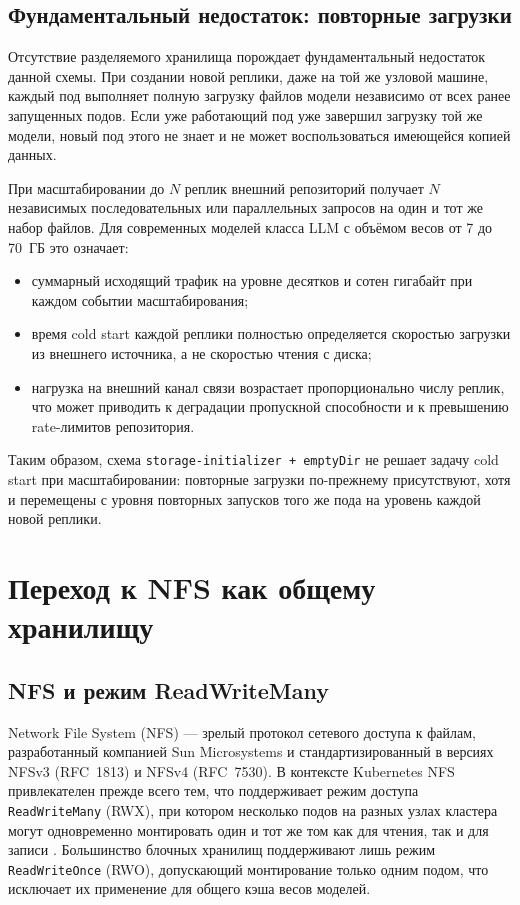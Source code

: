 \subsection*{Фундаментальный недостаток: повторные загрузки}

Отсутствие разделяемого хранилища порождает фундаментальный недостаток данной схемы. При создании новой реплики, даже на той же узловой машине, каждый под выполняет полную загрузку файлов модели независимо от всех ранее запущенных подов. Если уже работающий под уже завершил загрузку той же модели, новый под этого не знает и не может воспользоваться имеющейся копией данных.

При масштабировании до $N$ реплик внешний репозиторий получает $N$ независимых последовательных или параллельных запросов на один и тот же набор файлов. Для современных моделей класса LLM с объёмом весов от 7 до 70~ГБ это означает:
\begin{itemize}[leftmargin=*]
  \item суммарный исходящий трафик на уровне десятков и сотен гигабайт при каждом событии масштабирования;
  \item время cold start каждой реплики полностью определяется скоростью загрузки из внешнего источника, а не скоростью чтения с диска;
  \item нагрузка на внешний канал связи возрастает пропорционально числу реплик, что может приводить к деградации пропускной способности и к превышению rate-лимитов репозитория.
\end{itemize}

Таким образом, схема \texttt{storage-initializer + emptyDir} не решает задачу cold start при масштабировании: повторные загрузки по-прежнему присутствуют, хотя и перемещены с уровня повторных запусков того же пода на уровень каждой новой реплики.

\section{Переход к NFS как общему хранилищу}

\subsection*{NFS и режим ReadWriteMany}

Network File System (NFS) --- зрелый протокол сетевого доступа к файлам, разработанный компанией Sun Microsystems и стандартизированный в версиях NFSv3 (RFC~1813) и NFSv4 (RFC~7530). В контексте Kubernetes NFS привлекателен прежде всего тем, что поддерживает режим доступа \texttt{ReadWriteMany} (RWX), при котором несколько подов на разных узлах кластера могут одновременно монтировать один и тот же том как для чтения, так и для записи \cite{nfs_k8s_docs}. Большинство блочных хранилищ поддерживают лишь режим \texttt{ReadWriteOnce} (RWO), допускающий монтирование только одним подом, что исключает их применение для общего кэша весов моделей.

